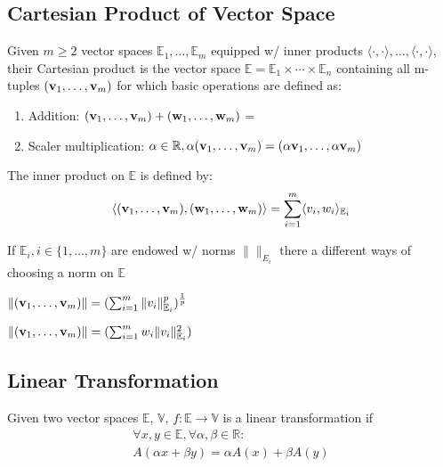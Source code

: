 \documentclass[11pt]{article}
\begin{document}
\subsection{Cartesian Product of Vector Space}
Given $m \ge 2$ vector spaces $\mathbb{E}_1, \ldots , \mathbb{E}_{m}$ equipped w/ inner products 
$\langle \cdot, \cdot  \rangle, \ldots , \langle \cdot, \cdot \rangle$, their Cartesian product is the vector
space $\mathbb{E} = \mathbb{E}_1 \times \cdots \times \mathbb{E}_{n}$ containing all m-tuples $( {\mathbf{v}}_1, \ldots ,{\mathbf{v}}_m ) $ for which basic operations are defined as:
\begin{enumerate}
    \item Addition: $( {\mathbf{v}}_{1}, \ldots ,{\mathbf{v}}_m ) + ( {\mathbf{w}}_1, \ldots ,{\mathbf{w}}_{m} ) $ = 
    \item Scaler multiplication: $\alpha \in \mathbb{R}, \alpha ({\mathbf{v}}_{1}, \ldots ,{\mathbf{v}}_{m}) = 
            (\alpha {\mathbf{v}}_{1}, \ldots , \alpha {\mathbf{v}}_{m})$
\end{enumerate}
The inner product on $\mathbb{E}$ is defined by:
\begin{align*}
    \langle ({\mathbf{v}}_{1}, \ldots ,{\mathbf{v}}_{m}), ({\mathbf{w}}_{1}, \ldots ,{\mathbf{w}}_{m}) \rangle = \sum_{i=1}^{m}\langle v_{i}, w_{i} \rangle _{\mathbb{E}_{i}}
\end{align*}

If $\mathbb{E}_{i}, i \in \{ 1, \ldots ,m \} $ are endowed w/ norms $\|  \| _{E_{i}}$ there a different 
ways of choosing a norm on $\mathbb{E}$
\begin{example}
    \item $\| ({\mathbf{v}}_{1}, \ldots ,{\mathbf{v}}_{m}) \| = (\sum_{i=1}^{m}\| v_{i} \|_{\mathbb{E}_{i}}^p)^{\frac{1}{p}} $
    \item $\| ({\mathbf{v}}_1, \ldots ,{\mathbf{v}}_{m}) \| = ( \sum_{i=1}^{m} w_{i}\| v_{i} \|_{\mathbb{E}_{i}}^2  ) $
\end{example}


\subsection{Linear Transformation}
\begin{definition}
    Given two vector spaces $\mathbb{E}$, $\mathbb{V}$, $f: \mathbb{E} \to \mathbb{V}$ is a linear transformation if
    \begin{align*}
        \forall x,y \in \mathbb{E}, \forall \alpha, \beta \in \mathbb{R}:\\
        A(\alpha x + \beta y) = \alpha A(x) + \beta A(y)
    \end{align*}
\end{definition}
\end{document}
